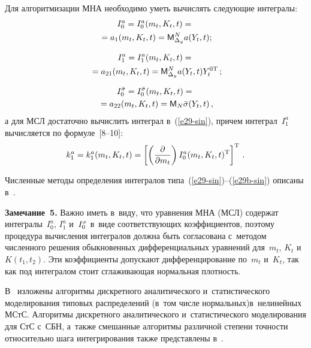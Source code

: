 \begin{multicols}{2}
\smallskip

Для алгоритмизации МНА необходимо уметь вычислять следующие интегралы:
\begin{multline}
I_0^a = I_0^a (m_t, K_t, t) ={}\\
{}=
 a_1 (m_t, K_t, t)= {\sf M}_{\Delta_y}^N a(Y_t, t);\label{e29-sin}
 \end{multline}
 
 \vspace*{-12pt}
 
 \noindent
 \begin{multline}
I_1^a = I_1^a (m_t, K_t, t)={}\\
{}=
 a_{21}(m_t, K_t, t)= {\sf M}_{\Delta_y}^N a(Y_t , t) Y_t^{\mathrm{0T}}\,;
 \label{e29a-sin}
  \end{multline}
 
 \vspace*{-12pt}
 
 \noindent
 \begin{multline}
I_0^{\bar {\sigma}} = I_0^{\bar {\sigma}} (m_t, K_t, t) ={}\\
{}=
a_{22}(m_t, K_t, t) = {\sf M}_N \bar {\sigma} (Y_t, t)\,,
\label{e29b-sin}
\end{multline}
а для МСЛ достаточно вычислить интеграл в~(\ref{e29-sin}), 
причем интеграл~$I_1^a$ вычисляется по формуле~[8--10]:
\begin{equation*}
k_1^a = k_1^a (m_t, K_t, t)=\left[ \left( \displaystyle\frac{\displaystyle \partial\mathstrut}{\displaystyle \partial m_t\mathstrut}\right) 
I_0^a (m_t, K_t, t)^{\mathrm{T}}\right]^{\mathrm{T}}\,.
\end{equation*}

Численные методы определения интегралов типа~(\ref{e29-sin})--(\ref{e29b-sin}) 
описаны в~\cite{7-sin, 11-sin}.

\smallskip

{ %
\noindent
\textbf{Замечание~5.}
Важно иметь в~виду, что уравнения МНА (МСЛ) содержат интегралы~$I_0^a$, 
$I_1^a$ и~$I_0^\sigma$ в~виде соответствующих коэффициентов, поэтому процедура 
вычисления интегралов должна быть согласована с~методом численного решения 
обыкновенных дифференциальных уравнений для~$m_t$, $K_t$ и~$K(t_1, t_2)$. 
Эти коэффициенты допускают дифференцирование по~$m_t$ и~$K_t$, так как под 
интегралом стоит сглаживающая нормальная плотность.
}

\smallskip

В~\cite{1-sin} изложены алгоритмы дискретного аналитического и~статистического
моделирования типовых распределений (в~том числе нормальных)\linebreak в~нелинейных
МСтС. Алгоритмы дискретного аналитического и~статистического
моделирования для СтС с~СБН, а~также смешанные алгоритмы различной
степени точности относительно шага интегрирования также представлены в~\cite{1-sin}.


\end{multicols}
